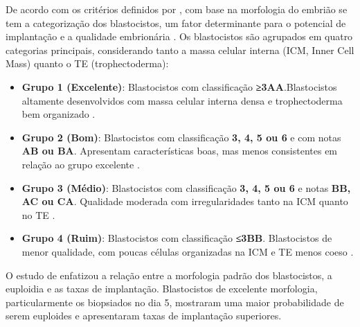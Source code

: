 De acordo com os critérios definidos por , com base na morfologia do embrião se tem a categorização dos blastocistos, um fator determinante para o potencial de implantação e a qualidade embrionária \cite{capalbo2014}. Os blastocistos são agrupados em quatro categorias principais, considerando tanto a massa celular interna (ICM, Inner Cell Mass) quanto o TE (trophectoderma):
\begin{itemize}
  \item \textbf{Grupo 1 (Excelente)}: Blastocistos com classificação \textbf{≥3AA}.Blastocistos altamente desenvolvidos com massa celular interna densa e trophectoderma bem organizado \cite{capalbo2014}.
  \item \textbf{Grupo 2 (Bom)}: Blastocistos com classificação \textbf{3, 4, 5 ou 6} e com notas \textbf{AB ou BA}. Apresentam características boas, mas menos consistentes em relação ao grupo excelente \cite{capalbo2014}.
  \item \textbf{Grupo 3 (Médio)}: Blastocistos com classificação \textbf{3, 4, 5 ou 6} e notas \textbf{BB, AC ou CA}. Qualidade moderada com irregularidades tanto na ICM quanto no TE \cite{capalbo2014}.
  \item \textbf{Grupo 4 (Ruim)}: Blastocistos com classificação \textbf{≤3BB}. Blastocistos de menor qualidade, com poucas células organizadas na ICM e TE menos coeso \cite{capalbo2014}.
\end{itemize}
O estudo de  enfatizou a relação entre a morfologia padrão dos blastocistos, a euploidia e as taxas de implantação. Blastocistos de excelente morfologia, particularmente os biopsiados no dia 5, mostraram uma maior probabilidade de serem euploides e apresentaram taxas de implantação superiores.

